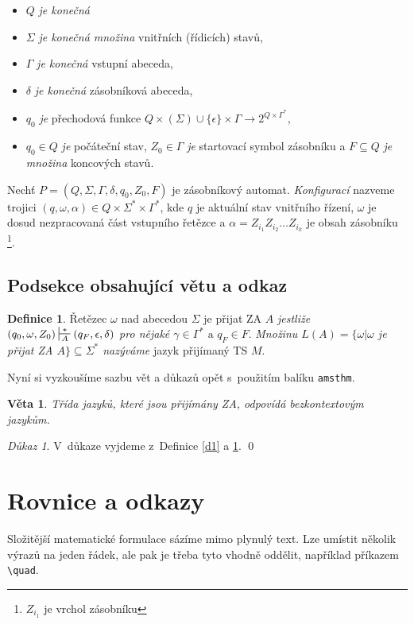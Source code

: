 \documentclass[11pt, a4paper, twocolumn]{article}
\theoremstyle{definition}
\newtheorem{definice}{Definice}
\theoremstyle{remark}
\newtheorem*{dukaz}{Důkaz}
\theoremstyle{plain}
\newtheorem{veta}{Věta}
\begin{document}
\begin{itemize}
\item$Q$ \emph{je konečná}
\item$\Sigma$ \emph{je konečná množina} vnitřních (řídicích) stavů,
\item$\Gamma$ \emph{je konečná} vstupní abeceda,
\item$\delta$ \emph{je konečná} zásobníková abeceda,
\item$q_0$ \emph{je} přechodová funkce $Q \times (\Sigma) \cup \{\epsilon\} \times \Gamma \to 2^{Q \times {\Gamma}^{*}}$,
\item$q_0 \in Q$ \emph{je} počáteční stav, $Z_0 \in \Gamma$ \emph{je} startovací symbol zásobníku a $F \subseteq Q$ \emph{je množina} koncových stavů.
\end{itemize}

Nechť $P = (Q, \Sigma, \Gamma, \delta, q_0, Z_0, F)$ je zásobníkový automat. \emph{Konfigurací} nazveme trojici $(q, \omega, \alpha) \in Q \times \Sigma^* \times  \Gamma^*$, kde $q$ je aktuální stav vnitřního řízení, $\omega$ je dosud nezpracovaná část vstupního řetězce a $\alpha = Z_{i_1} Z_{i_2} \ldots Z_{i_k}$ je obsah zásobníku \footnote{$Z_{i_1}$ je vrchol zásobníku}.

\subsection{Podsekce obsahující větu a odkaz}
\begin{definice}
\label{d2} Řetězec $\omega$ nad abecedou $\Sigma$ je přijat ZA $A$ \emph{jestliže $(q_0, \omega, Z_0) \sststile{A}{*} (q_F, \epsilon, \delta)$ pro nějaké $\gamma \in \Gamma^* \text{ a } {q_F \in F}$}. \emph{Množinu $L(A) = \{ \omega | \omega$ je přijat ZA $A \} \subseteq \Sigma^* $ nazýváme} jazyk přijímaný TS $M$.
\end{definice}

Nyní si vyzkoušíme sazbu vět a důkazů opět s~použitím
balíku \verb|amsthm|.

\begin{veta}
Třída jazyků, které jsou přijímány ZA, odpovídá
bezkontextovým jazykům.
\end{veta}

\begin{dukaz}
V~důkaze vyjdeme z~Definice \ref{d1} a \ref{d2}. \qed 
\end{dukaz}

\section{Rovnice a odkazy}
Složitější matematické formulace sázíme mimo plynulý text. Lze umístit několik výrazů na jeden řádek, ale pak je třeba tyto vhodně oddělit, například příkazem \verb|\quad|.
\end{document}
